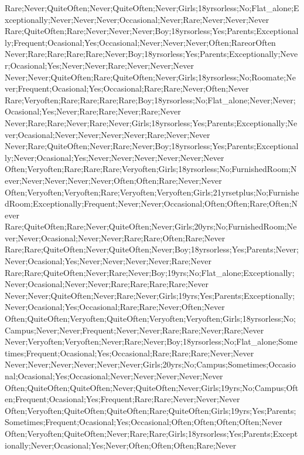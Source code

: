 Rare;Never;QuiteOften;Never;QuiteOften;Never;Girls;18yrsorless;No;Flat_alone;Exceptionally;Never;Never;Never;Occasional;Never;Rare;Never;Never;Never
Rare;QuiteOften;Rare;Never;Never;Never;Boy;18yrsorless;Yes;Parents;Exceptionally;Frequent;Ocasional;Yes;Occasional;Never;Never;Never;Often;RareorOften
Never;Rare;Rare;Rare;Rare;Never;Boy;18yrsorless;Yes;Parents;Exceptionally;Never;Ocasional;Yes;Never;Never;Rare;Never;Never;Never
Never;Never;QuiteOften;Rare;QuiteOften;Never;Girls;18yrsorless;No;Roomate;Never;Frequent;Ocasional;Yes;Occasional;Rare;Rare;Never;Often;Never
Rare;Veryoften;Rare;Rare;Rare;Rare;Boy;18yrsorless;No;Flat_alone;Never;Never;Ocasional;Yes;Never;Rare;Rare;Never;Rare;Never
Never;Rare;Rare;Never;Rare;Never;Girls;18yrsorless;Yes;Parents;Exceptionally;Never;Ocasional;Never;Never;Never;Never;Rare;Never;Never
Never;Rare;QuiteOften;Never;Rare;Never;Boy;18yrsorless;Yes;Parents;Exceptionally;Never;Ocasional;Yes;Never;Never;Never;Never;Never;Never
Often;Veryoften;Rare;Rare;Rare;Veryoften;Girls;18yrsorless;No;FurnishedRoom;Never;Never;Never;Never;Never;Often;Often;Rare;Never;Never
Often;Veryoften;Veryoften;Rare;Veryoften;Veryoften;Girls;21yrsetplus;No;FurnishedRoom;Exceptionally;Frequent;Never;Never;Occasional;Often;Often;Rare;Often;Never
Rare;QuiteOften;Rare;Never;QuiteOften;Never;Girls;20yrs;No;FurnishedRoom;Never;Never;Ocasional;Never;Never;Rare;Rare;Often;Rare;Never
Rare;Rare;QuiteOften;Never;QuiteOften;Never;Boy;18yrsorless;Yes;Parents;Never;Never;Ocasional;Yes;Never;Never;Never;Never;Rare;Never
Rare;Rare;QuiteOften;Never;Rare;Never;Boy;19yrs;No;Flat_alone;Exceptionally;Never;Ocasional;Never;Never;Rare;Rare;Rare;Rare;Never
Never;Never;QuiteOften;Never;Rare;Never;Girls;19yrs;Yes;Parents;Exceptionally;Never;Ocasional;Yes;Occasional;Rare;Rare;Never;Often;Never
Often;QuiteOften;Veryoften;QuiteOften;Veryoften;Veryoften;Girls;18yrsorless;No;Campus;Never;Never;Frequent;Never;Never;Rare;Rare;Never;Rare;Never
Never;Veryoften;Veryoften;Never;Rare;Never;Boy;18yrsorless;No;Flat_alone;Sometimes;Frequent;Ocasional;Yes;Occasional;Rare;Rare;Rare;Never;Never
Never;Never;Never;Never;Never;Never;Girls;20yrs;No;Campus;Sometimes;Occasional;Ocasional;Yes;Occasional;Never;Never;Never;Never;Never
Often;QuiteOften;QuiteOften;Never;QuiteOften;Never;Girls;19yrs;No;Campus;Often;Frequent;Ocasional;Yes;Frequent;Rare;Rare;Never;Never;Never
Often;Veryoften;QuiteOften;QuiteOften;Rare;QuiteOften;Girls;19yrs;Yes;Parents;Sometimes;Frequent;Ocasional;Yes;Occasional;Often;Often;Often;Often;Never
Often;Veryoften;QuiteOften;Never;Rare;Rare;Girls;18yrsorless;Yes;Parents;Exceptionally;Never;Ocasional;Yes;Never;Often;Often;Often;Rare;Never
